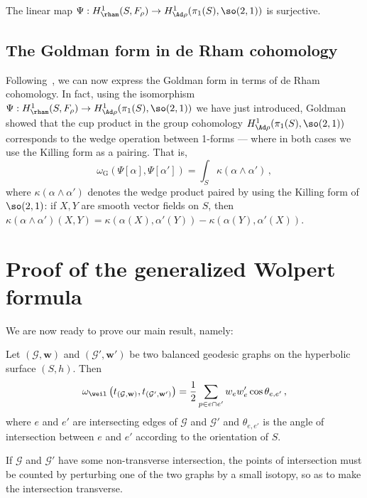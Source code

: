 \begin{lemm}
The linear map $\Psi:H^1_{\rham}(S,F_\rho)\to H^1_{\Ad\rho}(\pi_1(S),\so(2,1))$ is surjective.
\end{lemm}

\subsection{The Goldman form in de Rham cohomology}

Following~\cite{Goldman}, we can now express the Goldman form in terms of de Rham cohomology. In fact, using the isomorphism $\Psi:H^1_{\rham}(S,F_\rho)\to H^1_{\Ad\rho}(\pi_1(S),\so(2,1))$ we have just introduced, Goldman showed that the cup product in the group cohomology $H^1_{\Ad\rho}(\pi_1(S),\so(2,1))$ corresponds to the wedge operation between 1-forms --- where in both cases we use the Killing form as a pairing. That is,
\begin{equation}\label{eq goldman form in de rham}
\omega_{\mathrm G}\left(\Psi[\alpha],\Psi[\alpha']\right)=\int_S \kappa(\alpha\wedge\alpha')\,,
\end{equation}
where $\kappa(\alpha\wedge\alpha')$ denotes the wedge product paired by using the Killing form of $\so(2,1)$: if $X,Y$ are smooth vector fields on $S$, then $\kappa(\alpha \wedge \alpha')(X,Y)=\kappa(\alpha(X),\alpha'(Y))-\kappa(\alpha(Y),\alpha'(X))$.



\section{Proof of the generalized Wolpert formula}

We are now ready to prove our main result, namely:

\begin{theo}
Let $(\mathcal G,\mathbf w)$ and $(\mathcal G',\mathbf w')$ be two balanced geodesic graphs on the hyperbolic surface $(S,h)$. Then
\[
\omega_\weil\left(t_{(\mathcal G,\mathbf w)},t_{(\mathcal G',\mathbf w')}\right)=\frac{1}{2}\sum_{p\in e\cap e'}w_ew_e'\cos \theta_{e,e'}\,,
\]
where $e$ and $e'$ are intersecting edges of $\mathcal G$ and $\mathcal G'$ and $\theta_{e,e'}$ is the angle of intersection between $e$ and $e'$ according to the orientation of $S$.

If $\mathcal G$ and $\mathcal G'$ have some non-transverse intersection, the points of intersection must be counted by perturbing one of the two graphs by a small isotopy, so as to make the intersection transverse.
\end{theo}

